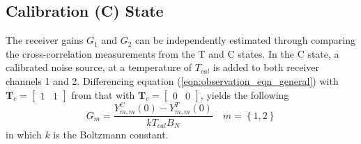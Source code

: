 \documentclass[draftcls,onecolumn]{IEEEtran}  %
\begin{document}
\subsection{Calibration (C) State}
\label{ssec:cal}
The receiver gains $G_1$ and $G_2$ can be independently estimated through comparing the cross-correlation measurements from the T and C states.
In the C state, a calibrated noise source, at a temperature of $T_{cal}$ is added to both receiver channels 1 and 2. 
Differencing equation (\ref{eqn:observation_eqn_general}) with  $\mathbf{T}_c  = [ \begin{array}{cc} 1 & 1 \end{array}]$ from that with $\mathbf{T}_c  = [ \begin{array}{cc} 0 & 0 \end{array}]$, yields the following 
\begin{equation}
G_m = \frac{Y^C_{m,m}(0) - Y^T_{m,m}(0)}{ k T_{cal} B_N} \,\,\,\,\,\,  m =\left\{1,2\right\}
\label{eqn:calstate}
\end{equation}
in which $k$ is the Boltzmann constant. 

\end{document}
